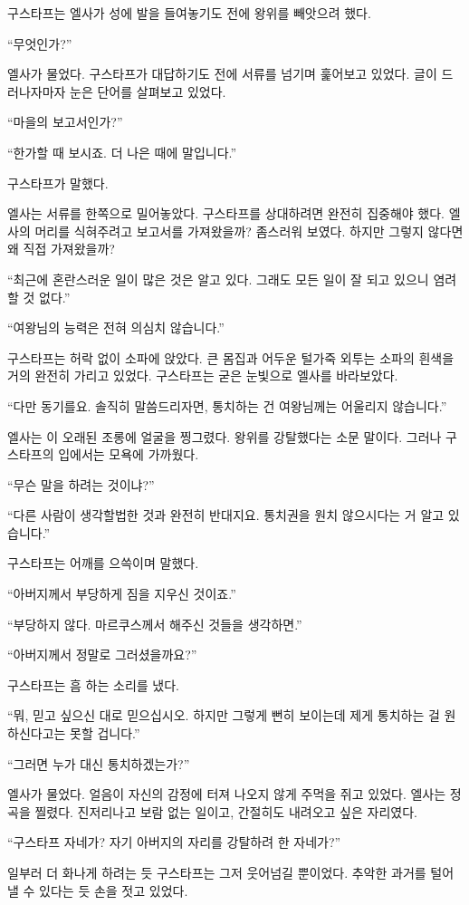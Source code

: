 구스타프는 엘사가 성에 발을 들여놓기도 전에 왕위를 빼앗으려 했다.

``무엇인가?''

엘사가 물었다. 구스타프가 대답하기도 전에 서류를 넘기며 훑어보고 있었다. 글이 드러나자마자 눈은 단어를 살펴보고 있었다.

``마을의 보고서인가?''

``한가할 때 보시죠. 더 나은 때에 말입니다.''

구스타프가 말했다.

엘사는 서류를 한쪽으로 밀어놓았다. 구스타프를 상대하려면 완전히 집중해야 했다. 엘사의 머리를 식혀주려고 보고서를 가져왔을까? 좀스러워 보였다. 하지만 그렇지 않다면 왜 직접 가져왔을까?

``최근에 혼란스러운 일이 많은 것은 알고 있다. 그래도 모든 일이 잘 되고 있으니 염려할 것 없다.''

``여왕님의 능력은 전혀 의심치 않습니다.''

구스타프는 허락 없이 소파에 앉았다. 큰 몸집과 어두운 털가죽 외투는 소파의 흰색을 거의 완전히 가리고 있었다. 구스타프는 굳은 눈빛으로 엘사를 바라보았다.

``다만 동기를요. 솔직히 말씀드리자면, 통치하는 건 여왕님께는 어울리지 않습니다.''

엘사는 이 오래된 조롱에 얼굴을 찡그렸다. 왕위를 강탈했다는 소문 말이다. 그러나 구스타프의 입에서는 모욕에 가까웠다.

``무슨 말을 하려는 것이냐?''

``다른 사람이 생각할법한 것과 완전히 반대지요. 통치권을 원치 않으시다는 거 알고 있습니다.''

구스타프는 어깨를 으쓱이며 말했다.

``아버지께서 부당하게 짐을 지우신 것이죠.''

``부당하지 않다. 마르쿠스께서 해주신 것들을 생각하면.''

``아버지께서 정말로 그러셨을까요?''

구스타프는 흠 하는 소리를 냈다.

``뭐, 믿고 싶으신 대로 믿으십시오. 하지만 그렇게 뻔히 보이는데 제게 통치하는 걸 원하신다고는 못할 겁니다.''

``그러면 누가 대신 통치하겠는가?''

엘사가 물었다. 얼음이 자신의 감정에 터져 나오지 않게 주먹을 쥐고 있었다. 엘사는 정곡을 찔렸다. 진저리나고 보람 없는 일이고, 간절히도 내려오고 싶은 자리였다.

``구스타프 자네가? 자기 아버지의 자리를 강탈하려 한 자네가?''

일부러 더 화나게 하려는 듯 구스타프는 그저 웃어넘길 뿐이었다. 추악한 과거를 털어낼 수 있다는 듯 손을 젓고 있었다.


